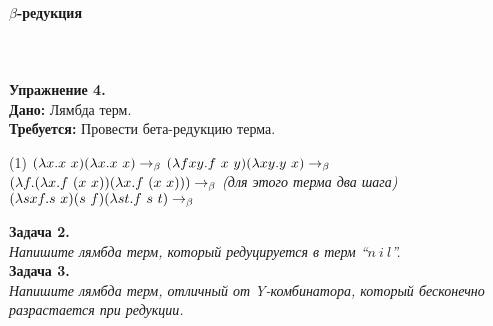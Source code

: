 \documentclass[lambda.tex]{subfiles}
\begin{document}
\paragraph{$\beta$-редукция}~\\\\
\textbf{Упражнение 4.}\\
\textbf{Дано:} Лямбда терм.\\
\textbf{Требуется:} Провести бета-редукцию терма.
\begin{tasks}(1)
	\task $(\lambda x.x\ x)(\lambda x.x\ x)\rb$
	\task $(\lambda fxy.f\ x\ y)(\lambda xy.y\ x)\rightarrow_\beta$
	\task $(\lambda f.(\lambda x.f\ (x\ x)) (\lambda x.f\ (x\ x)))\rb$ \emph{(для этого терма два шага)}
	\task $(\lambda sxf.s\ x)(s\ f)(\lambda st.f\ s\ t)\rightarrow_\beta$
\end{tasks}
\textbf{Задача 2.}~\\
\emph{Напишите лямбда терм, который редуцируется в терм ``$n\ i\ l$''.}\\
\textbf{Задача 3.}~\\
\emph{Напишите лямбда терм, отличный от Y-комбинатора, который бесконечно разрастается при редукции.}
\end{document}
